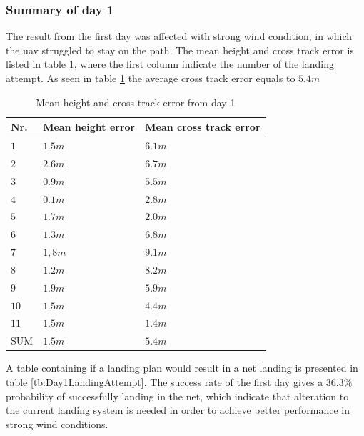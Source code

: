 \subsubsection{Summary of day 1}
The result from the first day was affected with strong wind condition, in which the \gls{uav} struggled to stay on the path. The mean height and cross track error is listed in table \ref{tb:Day1HeightCrossTrack}, where the first column indicate the number of the landing attempt. As seen in table \ref{tb:Day1HeightCrossTrack} the average cross track error equals to $5.4 m$ 
\begin{table}[H]
\centering
\begin{tabular}{| l | l | l |}
\hline
\textbf{Nr.} 	& \textbf{Mean height error} 	& \textbf{Mean cross track error}  \\ \hline
$1$				& $1.5 m$							& $6.1 m$								\\ \hline
$2$				& $2.6 m$							& $6.7 m$								\\ \hline
$3$				& $0.9 m$							& $5.5 m$								\\ \hline
$4$				& $0.1 m$							& $2.8 m$								\\ \hline
$5$				& $1.7 m$							& $2.0 m$								\\ \hline
$6$				& $1.3 m$							& $6.8 m$								\\ \hline
$7$				& $1,8 m$							& $9.1 m$								\\ \hline
$8$				& $1.2 m$							& $8.2 m$								\\ \hline
$9$				& $1.9 m$							& $5.9 m$								\\ \hline
$10$			& $1.5 m$							& $4.4 m$								\\ \hline
$11$			& $1.5 m$							& $1.4 m$								\\ \hline
SUM				& $1.5 m$							& $5.4 m$								\\ \hline
\end{tabular}
\caption{Mean height and cross track error from day 1}
\label{tb:Day1HeightCrossTrack}
\end{table}
A table containing if a landing plan would result in a net landing is presented in table \ref{tb:Day1LandingAttempt}. The success rate of the first day gives a $36.3  \% $ probability of successfully landing in the net, which indicate that alteration to the current landing system is needed in order to achieve better performance in strong wind conditions.
